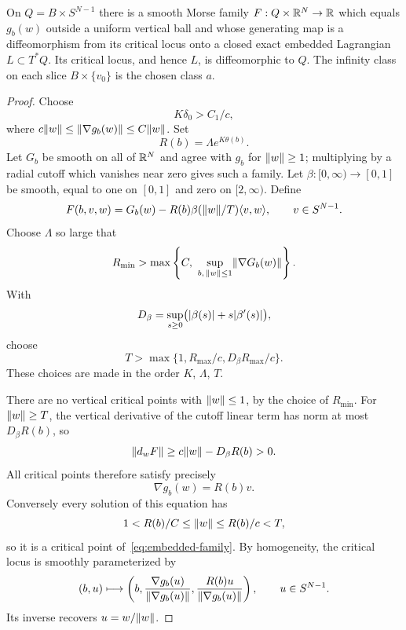 \begin{proposition}\label{prop:embedded-realization}
On $Q=B\times S^{N-1}$ there is a smooth Morse family $F:Q\times\mathbb R^N\to\mathbb R$ which equals $g_b(w)$ outside a uniform vertical ball and whose generating map is a diffeomorphism from its critical locus onto a closed exact embedded Lagrangian $L\subset T^*Q$. Its critical locus, and hence $L$, is diffeomorphic to $Q$. The infinity class on each slice $B\times\{v_0\}$ is the chosen class $a$.
\end{proposition}

\begin{proof}
Choose
\begin{equation}\label{eq:scale-choice}
 K\delta_0>C_1/c,
\end{equation}
where $c\lVert w\rVert\leq\lVert\nabla g_b(w)\rVert\leq C\lVert w\rVert$. Set
\[
 R(b)=\Lambda e^{K\theta(b)}.
\]
Let $G_b$ be smooth on all of $\mathbb R^N$ and agree with $g_b$ for $\lVert w\rVert\geq1$; multiplying by a radial cutoff which vanishes near zero gives such a family. Let $\beta:[0,\infty)\to[0,1]$ be smooth, equal to one on $[0,1]$ and zero on $[2,\infty)$. Define
\begin{equation}\label{eq:embedded-family}
 F(b,v,w)=G_b(w)-R(b)\beta(\lVert w\rVert/T)\langle v,w\rangle,
 \qquad v\in S^{N-1}.
\end{equation}
Choose $\Lambda$ so large that
\[
 R_{\min}>\max\left\{C,\ \sup_{b,\,\norm{w}\leq1}\norm{\nabla G_b(w)}\right\}.
\]
With
\[
 D_\beta=\sup_{s\geq0}\bigl(\lvert\beta(s)\rvert+s\lvert\beta'(s)\rvert\bigr),
\]
choose
\begin{equation}\label{eq:T-choice}
 T>\max\{1,R_{\max}/c,D_\beta R_{\max}/c\}.
\end{equation}
These choices are made in the order $K$, $\Lambda$, $T$.

There are no vertical critical points with $\lVert w\rVert\leq1$, by the choice of $R_{\min}$. For $\lVert w\rVert\geq T$, the vertical derivative of the cutoff linear term has norm at most $D_\beta R(b)$, so
\[
 \lVert d_wF\rVert\geq c\lVert w\rVert-D_\beta R(b)>0.
\]
All critical points therefore satisfy precisely
\begin{equation}\label{eq:embedded-critical}
 \nabla g_b(w)=R(b)v.
\end{equation}
Conversely every solution of this equation has
\[
 1<R(b)/C\leq\lVert w\rVert\leq R(b)/c<T,
\]
so it is a critical point of~\eqref{eq:embedded-family}. By homogeneity, the critical locus is smoothly parameterized by
\begin{equation}\label{eq:critical-parametrization}
 (b,u)\longmapsto
 \left(b,\frac{\nabla g_b(u)}{\lVert\nabla g_b(u)\rVert},
 \frac{R(b)u}{\lVert\nabla g_b(u)\rVert}\right),
 \qquad u\in S^{N-1}.
\end{equation}
Its inverse recovers $u=w/\lVert w\rVert$.


\end{proof}
